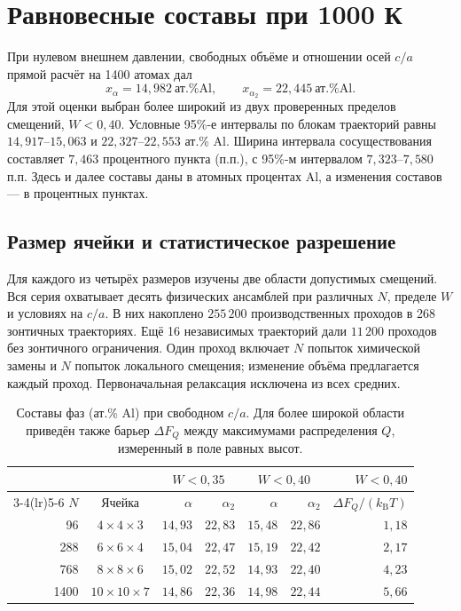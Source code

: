 \section{Равновесные составы при 1000 К}
\label{sec:bulk-results}

При нулевом внешнем давлении, свободных объёме и отношении осей
$c/a$ прямой расчёт на 1400 атомах дал
\[
 x_{\alpha}=14{,}982\ \text{ат.\% Al}, \qquad
 x_{\alpha_2}=22{,}445\ \text{ат.\% Al}.
\]
Для этой оценки выбран более широкий из двух проверенных пределов
смещений, $W<0{,}40$. Условные 95\%-е интервалы по блокам траекторий
равны $14{,}917$--$15{,}063$ и $22{,}327$--$22{,}553$ ат.\% Al.
Ширина интервала сосуществования составляет $7{,}463$ процентного
пункта (п.п.), с 95\%-м интервалом $7{,}323$--$7{,}580$ п.п.
Здесь и далее составы даны в атомных процентах Al, а изменения
составов --- в процентных пунктах.

\subsection{Размер ячейки и статистическое разрешение}

Для каждого из четырёх размеров изучены две области допустимых
смещений. Вся серия охватывает десять физических ансамблей при
различных $N$, пределе $W$ и условиях на $c/a$. В них накоплено
$255\,200$ производственных проходов в 268 зонтичных траекториях.
Ещё 16 независимых траекторий дали $11\,200$ проходов без зонтичного
ограничения. Один проход включает $N$ попыток химической замены
и $N$ попыток локального смещения; изменение объёма предлагается
каждый проход. Первоначальная релаксация исключена из всех средних.

\begin{table}[htbp]
\centering\small
\caption{Составы фаз (ат.\% Al) при свободном $c/a$. Для более
широкой области приведён также барьер $\Delta F_Q$ между максимумами
распределения $Q$, измеренный в поле равных высот.}
\label{tab:bulk-size}
\begin{tabular}{@{}r c rr rr r@{}}
\toprule
 & & \multicolumn{2}{c}{$W<0{,}35$} & \multicolumn{2}{c}{$W<0{,}40$}
 & $W<0{,}40$\\
\cmidrule(lr){3-4}\cmidrule(lr){5-6}
$N$ & Ячейка & $\alpha$ & $\alpha_2$ & $\alpha$ & $\alpha_2$
 & $\Delta F_Q/(k_{\mathrm B}T)$\\
\midrule
  96 & $4\times4\times3$   & $14{,}93$ & $22{,}83$ & $15{,}48$ & $22{,}86$ & $1{,}18$\\
 288 & $6\times6\times4$   & $15{,}04$ & $22{,}47$ & $15{,}19$ & $22{,}42$ & $2{,}17$\\
 768 & $8\times8\times6$   & $15{,}02$ & $22{,}52$ & $14{,}93$ & $22{,}40$ & $4{,}23$\\
1400 & $10\times10\times7$ & $14{,}86$ & $22{,}36$ & $14{,}98$ & $22{,}44$ & $5{,}66$\\
\bottomrule
\end{tabular}
\end{table}

